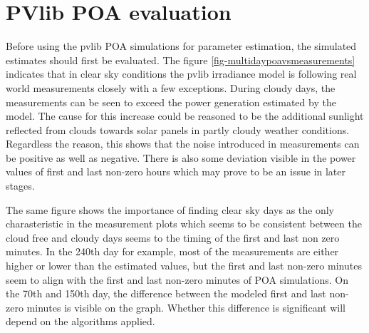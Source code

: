 \newpage
\section{PVlib POA evaluation}

Before using the pvlib POA simulations for parameter estimation, the simulated estimates should first be evaluated. The figure \ref{fig-multidaypoavsmeasurements} indicates that in clear sky conditions the pvlib irradiance model is following real world measurements closely with a few exceptions. During cloudy days, the measurements can be seen to exceed the power generation estimated by the model. The cause for this increase could be reasoned to be the additional sunlight reflected from clouds towards solar panels in partly cloudy weather conditions. Regardless the reason, this shows that the noise introduced in measurements can be positive as well as negative. There is also some deviation visible in the power values of first and last non-zero hours which may prove to be an issue in later stages.

The same figure shows the importance of finding clear sky days as the only charasteristic in the measurement plots which seems to be consistent between the cloud free and cloudy days seems to the timing of the first and last non zero minutes. In the 240th day for example, most of the measurements are either higher or lower than the estimated values, but the first and last non-zero minutes seem to align with the first and last non-zero minutes of POA simulations. On the 70th and 150th day, the difference between the modeled first and last non-zero minutes is visible on the graph. Whether this difference is significant will depend on the algorithms applied.






